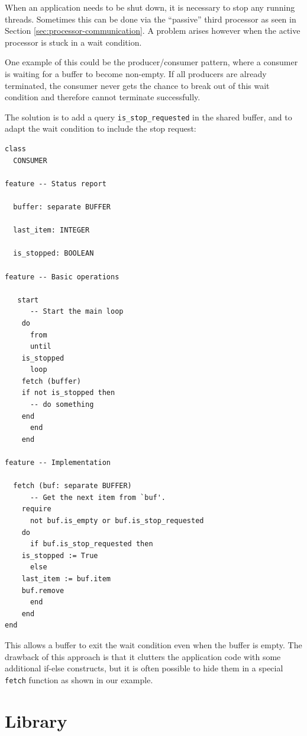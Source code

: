 \documentclass[a4paper,10pt]{article}
\begin{document}
When an application needs to be shut down, it is necessary to stop any running threads.
Sometimes this can be done via the ``passive'' third processor as seen in Section \ref{sec:processor-communication}.
A problem arises however when the active processor is stuck in a wait condition.

One example of this could be the producer/consumer pattern, where a consumer is waiting for a buffer to become non-empty.
If all producers are already terminated, the consumer never gets the chance to break out of this wait condition and therefore cannot terminate successfully.

The solution is to add a query \lstinline!is_stop_requested! in the shared buffer, and to adapt the wait condition to include the stop request:

\begin{lstlisting}[language=OOSC2Eiffel, captionpos=b, caption={Breaking out of a wait condition.}]
class
  CONSUMER

feature -- Status report

  buffer: separate BUFFER
  
  last_item: INTEGER
  
  is_stopped: BOOLEAN
  
feature -- Basic operations
  
   start
      -- Start the main loop
    do
      from 
      until 
	is_stopped
      loop
	fetch (buffer)
	if not is_stopped then
	  -- do something
	end
      end
    end
  
feature -- Implementation

  fetch (buf: separate BUFFER)
      -- Get the next item from `buf'.
    require
      not buf.is_empty or buf.is_stop_requested
    do
      if buf.is_stop_requested then
	is_stopped := True
      else
	last_item := buf.item
	buf.remove
      end
    end
end
\end{lstlisting}

This allows a buffer to exit the wait condition even when the buffer is empty.
The drawback of this approach is that it clutters the application code with some additional if-else constructs, 
but it is often possible to hide them in a special \lstinline!fetch! function as shown in our example.

\section {Library}
\label{sec:library}

 
\end{document}
